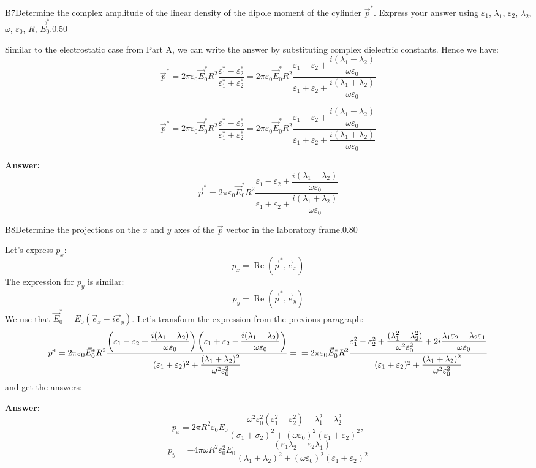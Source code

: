 \documentclass[11pt,a4paper]{article}
\begin{document}
\begin{solcard}{B7}{Determine the complex amplitude of the linear density of the dipole moment of the cylinder $\vec p ^*$. Express your answer using $\varepsilon_1$, $\lambda_1$, $\varepsilon_2$, $\lambda_2$, $\omega$, $\varepsilon_0$, $R$, $\vec E_0^*$.}{0.50}

Similar to the electrostatic case from Part A, we can write the answer by substituting complex dielectric constants. Hence we have: \[\vec p^*=2\pi\varepsilon_0\vec{E}_0^*R^2\dfrac{\varepsilon_1^*-\varepsilon_2^*}{\varepsilon_1^*+\varepsilon_2^*}=2\pi\varepsilon_0\vec{E}_0^*R^2\dfrac{\varepsilon_1-\varepsilon_2+\dfrac{i(\lambda_1-\lambda_2)}{\omega\varepsilon_0}}{\varepsilon_1+\varepsilon_2+\dfrac{i(\lambda_1+\lambda_2)}{\omega\varepsilon_0}}\]


\[\vec p^*=2\pi\varepsilon_0\vec{E}_0^*R^2\dfrac{\varepsilon_1^*-\varepsilon_2^*}{\varepsilon_1^*+\varepsilon_2^*}=2\pi\varepsilon_0\vec{E}_0^*R^2\dfrac{\varepsilon_1-\varepsilon_2+\dfrac{i(\lambda_1-\lambda_2)}{\omega\varepsilon_0}}{\varepsilon_1+\varepsilon_2+\dfrac{i(\lambda_1+\lambda_2)}{\omega\varepsilon_0}}\]

\par\smallskip\noindent\textbf{Answer:} \[\vec p^*=2\pi\varepsilon_0\vec{E}_0^*R^2\dfrac{\varepsilon_1-\varepsilon_2+\dfrac{i(\lambda_1-\lambda_2)}{\omega\varepsilon_0}}{\varepsilon_1+\varepsilon_2+\dfrac{i(\lambda_1+\lambda_2)}{\omega\varepsilon_0}}\]
\end{solcard}

\begin{solcard}{B8}{Determine the projections on the $x$ and $y$ axes of the $\vec p$ vector in the laboratory frame.}{0.80}

Let's express $p_x$: \[p_x=\operatorname{Re}{(\vec p^*,\vec e_x)}\]The expression for $p_y$ is similar: \[p_y=\operatorname{Re}{(\vec p^*,\vec e_y)}\]We use that $\vec{E}_0^* =E_0(\vec e_x-i\vec e_y)$. Let's transform the expression from the previous paragraph: \[\vec p^*=2\pi\varepsilon_0\vec{E}_0^*R^2\dfrac{\left(\varepsilon_1-\varepsilon_2+\dfrac{i(\lambda_1-\lambda_2)}{\omega\varepsilon_0}\right)\left(\varepsilon_1+\varepsilon_2-\dfrac{i(\lambda_1+\lambda_2)}{\omega\varepsilon_0}\right)}{(\varepsilon_1+\varepsilon_2)^2+\dfrac{(\lambda_1+\lambda_2)^2 }{\omega^2\varepsilon_0^2}} =\\= 2\pi\varepsilon_0\vec{E}_0^*R^2\dfrac{\varepsilon_1^2 - \varepsilon_2^2 + \dfrac{(\lambda_1^2-\lambda_2^2)}{\omega^2\varepsilon_0^2} + 2i\dfrac{\lambda_1\varepsilon_2 -\lambda_2\varepsilon_1}{\omega\varepsilon_0}}{(\varepsilon_1+\varepsilon_2)^2+\dfrac{(\lambda_1+\lambda_2)^2}{\omega^2\varepsilon_0^2}}\] and get the answers:

\par\smallskip\noindent\textbf{Answer:} \[p_x=2\pi R^2\varepsilon_0E_0\dfrac{\omega^2\varepsilon_0^2(\varepsilon_1^2-\varepsilon_2^2)+\lambda_1^2-\lambda_2^2 }{(\sigma_1 + \sigma_2)^2 + (\omega \varepsilon_0)^2 (\varepsilon_1 + \varepsilon_2)^2},\]\[p_y=-4\pi\omega R^2\varepsilon_0^2E_0\dfrac{(\varepsilon_1\lambda_2-\varepsilon_2\lambda_1) }{(\lambda_1 + \lambda_2)^2 + (\omega \varepsilon_0)^2 (\varepsilon_1 + \varepsilon_2)^2}\]
\end{solcard}
\end{document}
